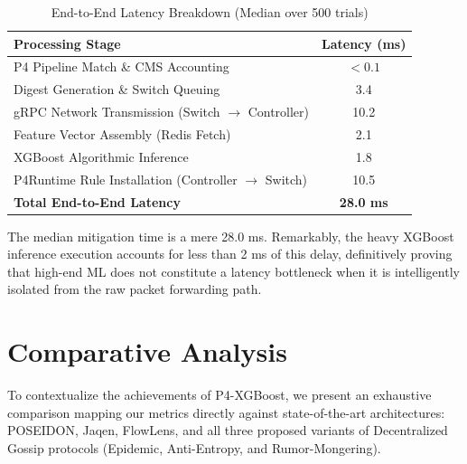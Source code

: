 \documentclass[sigconf, nonacm]{acmart}
\begin{document}
\begin{table}[htbp]
\centering
\caption{End-to-End Latency Breakdown (Median over 500 trials)}
\label{tab:latency}
\renewcommand{\arraystretch}{1.2}
\small
\begin{tabularx}{\columnwidth}{|X|c|}
\hline
\textbf{Processing Stage} & \textbf{Latency (ms)} \\
\hline
P4 Pipeline Match \& CMS Accounting & $< 0.1$ \\ \hline
Digest Generation \& Switch Queuing & 3.4 \\ \hline
gRPC Network Transmission (Switch $\rightarrow$ Controller) & 10.2 \\ \hline
Feature Vector Assembly (Redis Fetch) & 2.1 \\ \hline
XGBoost Algorithmic Inference & 1.8 \\ \hline
P4Runtime Rule Installation (Controller $\rightarrow$ Switch) & 10.5 \\ \hline
\hline
\textbf{Total End-to-End Latency} & \textbf{28.0 ms} \\
\hline
\end{tabularx}
\end{table}

The median mitigation time is a mere 28.0 ms. Remarkably, the heavy XGBoost inference execution accounts for less than 2 ms of this delay, definitively proving that high-end ML does not constitute a latency bottleneck when it is intelligently isolated from the raw packet forwarding path.

\section{Comparative Analysis}

To contextualize the achievements of P4-XGBoost, we present an exhaustive comparison mapping our metrics directly against state-of-the-art architectures: POSEIDON, Jaqen, FlowLens, and all three proposed variants of Decentralized Gossip protocols (Epidemic, Anti-Entropy, and Rumor-Mongering).
\end{document}
